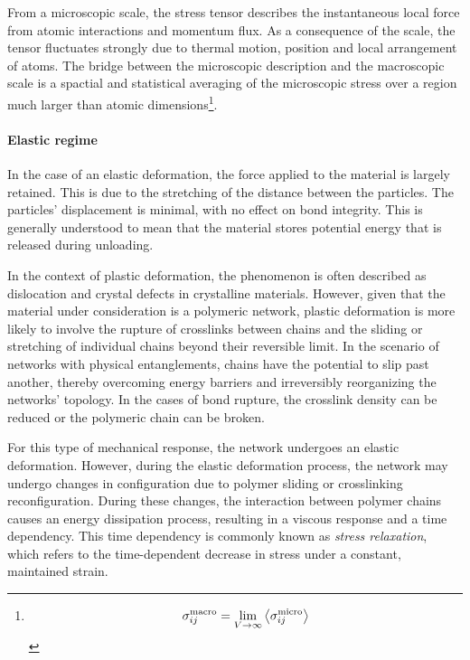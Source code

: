 From a microscopic scale, the stress tensor describes the instantaneous local force from atomic interactions and momentum flux.
As a consequence of the scale, the tensor fluctuates strongly due to thermal motion, position and local arrangement of atoms.
The bridge between the microscopic description and the macroscopic scale is a spactial and statistical averaging of the microscopic stress over a region much larger than atomic dimensions\footnote{\[\sigma_{ij}^{\mathrm{macro}}=\lim_{V\to\infty}\expval{\sigma_{ij}^{\mathrm{micro}}}\]}.


\paragraph{Elastic regime} 
In the case of an elastic deformation, the force applied to the material is largely retained.
This is due to the stretching of the distance between the particles.
The particles' displacement is minimal, with no effect on bond integrity.
This is generally understood to mean that the material stores potential energy that is released during unloading.

In the context of plastic deformation, the phenomenon is often described as dislocation and crystal defects in crystalline materials.
However, given that the material under consideration is a polymeric network, plastic deformation is more likely to involve the rupture of crosslinks between chains and the sliding or stretching of individual chains beyond their reversible limit.
In the scenario of networks with physical entanglements, chains have the potential to slip past another, thereby overcoming energy barriers and irreversibly reorganizing the networks' topology.
In the cases of bond rupture, the crosslink density can be reduced or the polymeric chain can be broken.

For this type of mechanical response, the network undergoes an elastic deformation.
However, during the elastic deformation process, the network may undergo changes in configuration due to polymer sliding or crosslinking reconfiguration.
During these changes, the interaction between polymer chains causes an energy dissipation process, resulting in a viscous response and a time dependency.
This time dependency is commonly known as \textit{stress relaxation}, which refers to the time-dependent decrease in stress under a constant, maintained strain.

